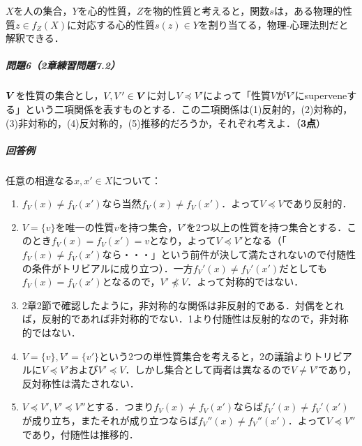 \documentclass[11pt,a4paper]{jsarticle}
\begin{document}
$X$を人の集合，$Y$を心的性質，$Z$を物的性質と考えると，関数$s$は，ある物理的性質$z \in f_Z(X)$に対応する心的性質$s(z) \in Y$を割り当てる，物理-心理法則だと解釈できる．



\subparagraph{問題6（2章練習問題7.2）}
$\boldsymbol{V}$を性質の集合とし，$V, V' \in \boldsymbol{V}$に対し$V \preceq V'$によって「性質$V$が$V'$にsuperveneする」という二項関係を表すものとする．この二項関係は(1)反射的，(2)対称的，(3)非対称的，(4)反対称的，(5)推移的だろうか，それぞれ考えよ．（\textbf{3点}）

\subparagraph{回答例}
任意の相違なる$x, x' \in X$について：
\begin{enumerate}
 \item $f_V(x) \neq f_V(x')$なら当然$f_V(x) \neq f_V(x')$．よって$V \preceq V$であり反射的．
 \item $V = \{ v \}$を唯一の性質$v$を持つ集合，$V'$を2つ以上の性質を持つ集合とする．このとき$f_V(x) = f_V(x')=v$となり，よって$V \preceq V'$となる（「$f_V(x) \neq f_V(x')$なら・・・」という前件が決して満たされないので付随性の条件がトリビアルに成り立つ）．一方$f_V'(x) \neq f_V'(x')$だとしても$f_V(x) = f_V(x')$となるので，$V' \not\preceq V$．よって対称的ではない．
 \item 2章2節で確認したように，非対称的な関係は非反射的である．対偶をとれば，反射的であれば非対称的でない．1より付随性は反射的なので，非対称的ではない．
 \item $V = \{v\}, V' = \{v'\}$という2つの単性質集合を考えると，2の議論よりトリビアルに$V \preceq V'$および$V' \preceq V$．しかし集合として両者は異なるので$V \neq V'$であり，反対称性は満たされない．
 \item $V \preceq V', V' \preceq V''$とする．つまり$f_V(x) \neq f_V(x')$ならば$f_V'(x) \neq f_V'(x')$が成り立ち，またそれが成り立つならば$f_V''(x) \neq f_V''(x')$．よって$V \preceq V''$であり，付随性は推移的．
\end{enumerate}
\end{document}
